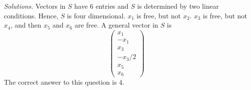     \ifnum {} {\color{DarkBlue} \textit{Solutions.} 
    Vectors in $S$ have 6 entries and $S$ is determined by two linear conditions.  Hence, $S$ is four dimensional.  $x_1$ is free, but not $x_2$. $x_3$ is free, but not $x_4$, and then $x_5$ and $x_6$ are  free.  A general vector in $S$ is 
    \begin{equation}
        \begin{pmatrix}
            x_1 \\ - x_1 \\ x_3 \\ - x_3/2 \\ x_5 \\ x_6 
        \end{pmatrix}
    \end{equation}
    The correct answer to this question is $4$. 
    } 
   \else
   \fi
\fi        